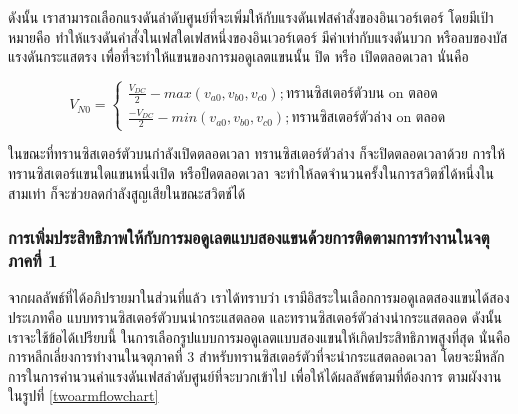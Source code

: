 \documentclass[11pt,a4paper]{article}
\begin{document}
ดังนั้น เราสามารถเลือกแรงดันลำดับศูนย์ที่จะเพิ่มให้กับแรงดันเฟสคำสั่งของอินเวอร์เตอร์ โดยมีเป้าหมายคือ ทำให้แรงดันคำสั่งในเฟสใดเฟสหนึ่งของอินเวอร์เตอร์ มีค่าเท่ากับแรงดันบวก หรือลบของบัสแรงดันกระแสตรง เพื่อที่จะทำให้แขนของการมอดูเลตแขนนั้น ปิด หรือ เปิดตลอดเวลา นั่นคือ

\begin{equation}
    V_{N0} = \begin{cases}
        \frac{V_{DC}}{2}-max(v_{a0},v_{b0},v_{c0}); \text{ทรานซิสเตอร์ตัวบน on ตลอด} \\
        \frac{-V_{DC}}{2}-min(v_{a0},v_{b0},v_{c0}); \text{ทรานซิสเตอร์ตัวล่าง on ตลอด}
    \end{cases}
\end{equation}

ในขณะที่ทรานซิสเตอร์ตัวบนกำลังเปิดตลอดเวลา ทรานซิสเตอร์ตัวล่าง ก็จะปิดตลอดเวลาด้วย การให้ทรานซิสเตอร์แขนใดแขนหนึ่งเปิด หรือปืดตลอดเวลา จะทำให้ลดจำนวนครั้งในการสวิตช์ได้หนึ่งในสามเท่า ก็จะช่วยลดกำลังสูญเสียในขณะสวิตช์ได้

\subsubsection{การเพิ่มประสิทธิภาพให้กับการมอดูเลตแบบสองแขนด้วยการติดตามการทำงานในจตุภาคที่ 1}

จากผลลัพธ์ที่ได้อภิปรายมาในส่วนที่แล้ว เราได้ทราบว่า เรามีอิสระในเลือกการมอดูเลตสองแขนได้สองประเภทคือ แบบทรานซิสเตอร์ตัวบนนำกระแสตลอด และทรานซิสเตอร์ตัวล่างนำกระแสตลอด ดังนั้น เราจะใช้ข้อได้เปรียบนี้ ในการเลือกรูปแบบการมอดูเลตแบบสองแขนให้เกิดประสิทธิภาพสูงที่สุด นั่นคือ การหลีกเลี่ยงการทำงานในจตุภาคที่ 3 สำหรับทรานซิสเตอร์ตัวที่จะนำกระแสตลอดเวลา โดยจะมีหลักการในการคำนวนค่าแรงดันเฟสลำดับศูนย์ที่จะบวกเข้าไป เพื่อให้ได้ผลลัพธ์ตามที่ต้องการ ตามผังงานในรูปที่ \ref{twoarmflowchart}
\end{document}
